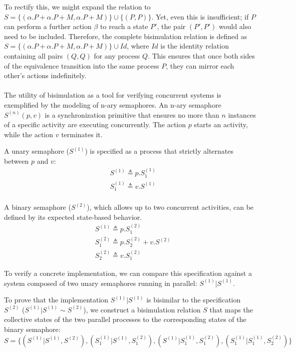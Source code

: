 To rectify this, we might expand the relation to $S=\{(\alpha.P+\alpha.P+M,\alpha.P+M)\}\cup\{(P,P)\}$. Yet, even this is insufficient; if $P$ can perform a further action $\beta$ to reach a state $P'$, the pair $(P',P')$ would also need to be included. Therefore, the complete bisimulation relation is defined as $S=\{(\alpha.P+\alpha.P+M,\alpha.P+M)\}\cup Id$, where $Id$ is the identity relation containing all pairs $(Q,Q)$ for any process $Q$. This ensures that once both sides of the equivalence transition into the same process $P$, they can mirror each other's actions indefinitely.\\\\
The utility of bisimulation as a tool for verifying concurrent systems is exemplified by the modeling of n-ary semaphores. An n-ary semaphore $S^{(n)}(p,v)$ is a synchronization primitive that ensures no more than $n$ instances of a specific activity are executing concurrently. The action $p$ starts an activity, while the action $v$ terminates it.

A unary semaphore ($S^{(1)}$) is specified as a process that strictly alternates between $p$ and $v$:
\begin{align*}
    &S^{(1)}\triangleq p.S_1^{(1)}\\
    &S_1^{(1)}\triangleq v.S^{(1)}\\
\end{align*}

A binary semaphore ($S^{(2)}$), which allows up to two concurrent activities, can be defined by its expected state-based behavior. 
\begin{align*}
    &S^{(1)} \triangleq p.S_1^{(2)}\\
    &S_1^{(2)} \triangleq p.S_2^{(2)} + v.S^{(2)}\\
    &S_2^{(2)} \triangleq v.S_1^{(2)}
\end{align*}

To verify a concrete implementation, we can compare this specification against a system composed of two unary semaphores running in parallel: $S^{(1)}|S^{(1)}$.

To prove that the implementation $S^{(1)}|S^{(1)}$ is bisimilar to the specification $S^{(2)}$ ($S^{(1)}|S^{(1)}\sim S^{(2)}$), we construct a bisimulation relation $S$ that maps the collective states of the two parallel processes to the corresponding states of the binary semaphore:
\begin{equation*}
    S=\{(S^{(1)}|S^{(1)},S^{(2)}),(S_1^{(1)}|S^{(1)},S_1^{(2)}),(S^{(1)}|S_1^{(1)},S_1^{(2)}), (S_1^{(1)}|S_1^{(1)},S_2^{(2)})\}
\end{equation*}

